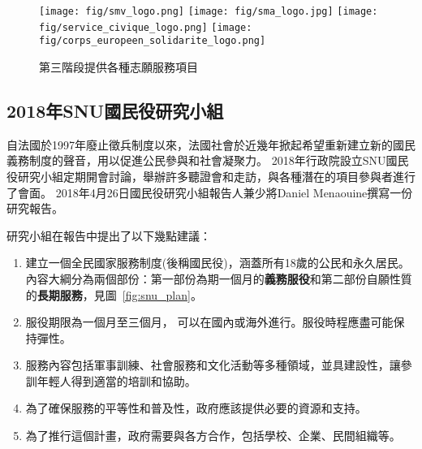 \documentclass[a4paper,14pt]{extarticle}
\theoremstyle{plain}
\theoremstyle{remark}
\numberwithin{equation}{section}
\begin{document}
\begin{figure}[H]
  \begin{center}
    \texttt{[image: fig/smv\_logo.png]}
    \texttt{[image: fig/sma\_logo.jpg]}
    \texttt{[image: fig/service\_civique\_logo.png]}
    \texttt{[image: fig/corps\_europeen\_solidarite\_logo.png]}
  \end{center}
  \caption{第三階段提供各種志願服務項目}
\end{figure}


\subsection{2018年SNU國民役研究小組}\label{subsection:snu_gdt}


自法國於1997年廢止徵兵制度以來，法國社會於近幾年掀起希望重新建立新的國民義務制度的聲音，用以促進公民參與和社會凝聚力。
2018年行政院設立SNU國民役研究小組定期開會討論，舉辦許多聽證會和走訪，與各種潛在的項目參與者進行了會面。
2018年4月26日國民役研究小組報告人兼少將Daniel Menaouine撰寫一份研究報告。


研究小組在報告中提出了以下幾點建議：

\begin{enumerate}
  \item 
建立一個全民國家服務制度(後稱國民役)，涵蓋所有18歲的公民和永久居民。
內容大綱分為兩個部份：第一部份為期一個月的\textbf{義務服役}和第二部份自願性質的\textbf{長期服務}，見圖~\ref{fig:snu_plan}。
\item 
服役期限為一個月至三個月， 可以在國內或海外進行。服役時程應盡可能保持彈性。
\item 
服務內容包括軍事訓練、社會服務和文化活動等多種領域，並具建設性，讓參訓年輕人得到適當的培訓和協助。
\item 
為了確保服務的平等性和普及性，政府應該提供必要的資源和支持。
\item 
為了推行這個計畫，政府需要與各方合作，包括學校、企業、民間組織等。
\end{enumerate}
\end{document}
